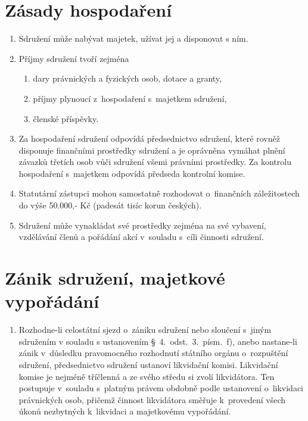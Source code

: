 \documentclass[a4paper]{article}
\begin{document}
\section{Zásady hospodaření}
    \begin{enumerate}
    \item Sdružení může nabývat majetek, užívat jej a disponovat s ním.

    \item Příjmy sdružení tvoří zejména
        \begin{enumerate}
        \item dary právnických a fyzických osob, dotace a granty,
        \item příjmy plynoucí z~hospodaření s~majetkem sdružení,
        \item členské příspěvky.
        \end{enumerate}

    \item Za hospodaření sdružení odpovídá předsednictvo sdružení, které
        rovněž disponuje finančními prostředky sdružení a je oprávněna vymáhat
        plnění závazků třetích osob vůči sdružení všemi právními prostředky.
        Za kontrolu hospodaření s~majetkem odpovídá předseda kontrolní komise.

    \item Statutární zástupci mohou samostatně rozhodovat o~finančních
        záležitostech do výše 50.000,- Kč (padesát tisíc korun českých).

    \item Sdružení může vynakládat své prostředky zejména na své vybavení,
        vzdělávání členů a pořádání akcí v~souladu s~cíli činnosti sdružení.
    \end{enumerate}



\section{Zánik sdružení, majetkové vypořádání}
    \begin{enumerate}
    \item Rozhodne-li celostátní sjezd o~zániku sdružení nebo sloučení s~jiným
        sdružením v souladu s ustanovením \S~4.~odst.~3.~písm.~f), anebo nastane-li zánik
        v~důsledku pravomocného rozhodnutí státního orgánu o~rozpuštění
        sdružení, předsednictvo sdružení ustanoví likvidační komisi.
        Likvidační komise je nejméně tříčlenná a ze svého středu si zvolí
        likvidátora. Ten postupuje v~souladu s~platným právem obdobně podle
        ustanovení o~likvidaci právnických osob, přičemž činnost likvidátora
        směřuje k~provedení všech úkonů nezbytných k~likvidaci a majetkovému
        vypořádání.
    \end{enumerate}
\end{document}
